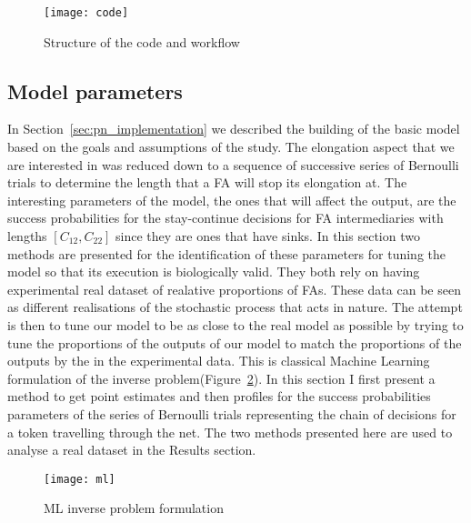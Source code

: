 \begin{figure}[htbp!]
\centering
\texttt{[image: code]}
\caption[Workflow]{Structure of the code and workflow}
\label{fig:code}
\end{figure}


\subsection{Model parameters}
In Section~\ref{sec:pn_implementation} we described the building of the basic model
based on the goals and assumptions of the study. The elongation aspect
that we are interested in was reduced down to a sequence of successive
series of Bernoulli trials to determine the length that a FA will
stop its elongation at. The interesting parameters of the model, the
ones that will affect the output, are the success probabilities for
the stay-continue decisions for FA intermediaries with lengths
$[C_{12}, C_{22}]$ since they are ones that have sinks. In this
section two methods are presented for the identification of these parameters for
tuning the model so that its execution is biologically valid. They both rely on having experimental real dataset of
realative proportions of FAs. These data can be
seen as different realisations of the stochastic process that acts in nature. The attempt is then to tune our
model to be as close to the real model as possible by trying to tune
the proportions of the outputs of our model to match the proportions
of the outputs by the in the experimental
data. This is  classical Machine Learning formulation of the inverse
problem(Figure~\ref{fig:ml}). In this section I first present a method to get point
estimates and then profiles for the success probabilities parameters of the series of Bernoulli
trials representing the chain of decisions for a token travelling
through the net. The two methods presented here are used to analyse a
real dataset in the Results section.

\begin{figure}[htbp!]
\centering
\texttt{[image: ml]}
\caption[ML inverse problem formulation]{ML inverse problem formulation}
\label{fig:ml}
\end{figure}



